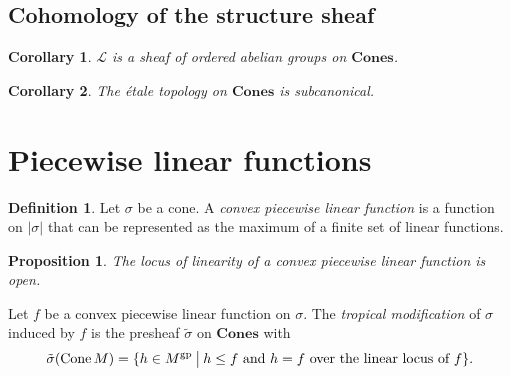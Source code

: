 \documentclass[12pt]{amsart}
\theoremstyle{plan}
\newtheorem{proposition}[theorem]{Proposition}
\newtheorem{corollary}{Corollary}
\numberwithin{lemma}{theorem}
\numberwithin{corollary}{theorem}
\theoremstyle{definition}
\newtheorem{definition}[theorem]{Definition}
\theoremstyle{remark}
\def\Cones{\mathbf{Cones}}
\def\Cone{\operatorname{Cone}}
\begin{document}
\subsection{Cohomology of the structure sheaf}

\begin{corollary}
$\mathscr L$ is a sheaf of ordered abelian groups on $\Cones$.
\end{corollary}

\begin{corollary}
The \'etale topology on $\Cones$ is subcanonical.
\end{corollary}

\section{Piecewise linear functions}

\begin{definition}
Let $\sigma$ be a cone.  A \emph{convex piecewise linear function} is a function on $|\sigma|$ that can be represented as the maximum of a finite set of linear functions.
\end{definition}

\begin{proposition}
The locus of linearity of a convex piecewise linear function is open.
\end{proposition}

Let $f$ be a convex piecewise linear function on $\sigma$.  The \emph{tropical modification} of $\sigma$ induced by $f$ is the presheaf $\tilde\sigma$ on $\Cones$ with
\begin{equation*}
\tilde\sigma(\Cone M) = \{ h \in M^{\rm gp} \: \big| \: \text{$h \leq f$ and $h = f$ over the linear locus of $f$} \} .
\end{equation*}



\end{document}
